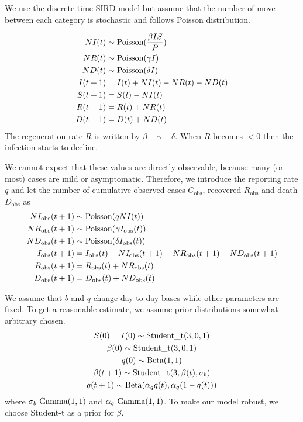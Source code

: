 \documentclass{amsart}
\begin{document}
We use the discrete-time SIRD model but assume that the number of move between each category is stochastic and follows Poisson distribution.

\begin{align}
 NI(t) &\sim \textup{Poisson}(\frac{\beta I S}{P})\\
 NR(t) &\sim \textup{Poisson}(\gamma I)\\
 ND(t) &\sim \textup{Poisson}(\delta I)\\
 I(t+1) &= I(t) + NI(t) - NR(t) - ND(t)\\
 S(t+1) &= S(t) - NI(t)\\
 R(t+1) &= R(t) + NR(t)\\
 D(t+1) &= D(t) + ND(t)
\end{align}
The regeneration rate $R$ is written by $\beta - \gamma - \delta$.
When $R$ becomes $<0$ then the infection starts to decline.

We cannot expect that these values are directly observable, because many (or most) cases are mild or asymptomatic.
Therefore, we introduce the reporting rate $q$ and let the number of cumulative observed cases $C_{\text{obs}}$, recovered $R_{\text{obs}}$ and death $D_{\text{obs}}$ as
\begin{align}
 NI_{\text{obs}}(t+1) &\sim \textup{Poisson}(q NI(t))\\
 NR_{\text{obs}}(t+1) &\sim \textup{Poisson}(\gamma I_{\text{obs}}(t))\\
 ND_{\text{obs}}(t+1) &\sim \textup{Poisson}(\delta I_{\text{obs}}(t))\\
 I_{\text{obs}}(t+1) &= I_{\text{obs}}(t) + NI_{\text{obs}}(t+1) - NR_{\text{obs}}(t+1) - ND_{\text{obs}}(t+1)\\
 R_{\text{obs}}(t+1) &= R_{\text{obs}}(t) + NR_{\text{obs}}(t)\\
 D_{\text{obs}}(t+1) &= D_{\text{obs}}(t) + ND_{\text{obs}}(t)
\end{align}

We assume that $b$ and $q$ change day to day bases while other parameters are fixed.
To get a reasonable estimate, we assume prior distributions somewhat arbitrary chosen.
\begin{gather}
 S(0) = I(0) \sim \textup{Student\_t}(3, 0, 1)\\
 \beta(0) \sim \textup{Student\_t}(3, 0, 1)\\
 q(0) \sim \textup{Beta}(1, 1)\\
 \beta(t+1) \sim \textup{Student\_t}(3, \beta(t), \sigma_b)\\
 q(t+1) \sim \textup{Beta}(\alpha_q q(t), \alpha_q(1 - q(t)))
\end{gather}
where $\sigma_b ~ \textup{Gamma}(1, 1)$ and $\alpha_q ~ \textup{Gamma}(1, 1)$.
To make our model robust, we choose Student-t as a prior for $\beta$.
\end{document}

